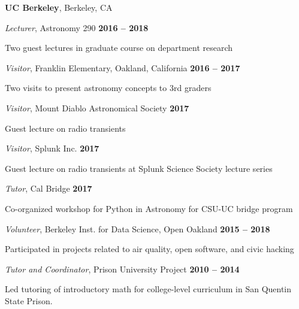 \documentclass[11pt]{article}
\begin{document}
\textbf{UC Berkeley}, Berkeley, CA
\begin{outerlist}

\item[] \textit{Lecturer}, Astronomy 290
    \hfill \textbf{2016 -- 2018}
    \begin{innerlist}
        \item Two guest lectures in graduate course on department research
    \end{innerlist}

\item[] \textit{Visitor}, Franklin Elementary, Oakland, California
    \hfill \textbf{2016 -- 2017}
    \begin{innerlist}
        \item Two visits to present astronomy concepts to 3rd graders
    \end{innerlist}

\item[] \textit{Visitor}, Mount Diablo Astronomical Society
    \hfill \textbf{2017}
    \begin{innerlist}
        \item Guest lecture on radio transients
    \end{innerlist}

\item[] \textit{Visitor}, Splunk Inc.
    \hfill \textbf{2017}
    \begin{innerlist}
        \item Guest lecture on radio transients at Splunk Science Society lecture series
    \end{innerlist}

\item[] \textit{Tutor}, Cal Bridge
    \hfill \textbf{2017}
    \begin{innerlist}
        \item Co-organized workshop for Python in Astronomy for CSU-UC bridge program
    \end{innerlist}

\item[] \textit{Volunteer}, Berkeley Inst. for Data Science, Open Oakland
    \hfill \textbf{2015 -- 2018}
    \begin{innerlist}
        \item Participated in projects related to air quality, open software, and civic hacking
    \end{innerlist}

\item[] \textit{Tutor and Coordinator}, Prison University Project
    \hfill \textbf{2010 -- 2014}
    \begin{innerlist}
        \item Led tutoring of introductory math for college-level curriculum in San Quentin State Prison.
    \end{innerlist}


\end{outerlist}
\end{document}
